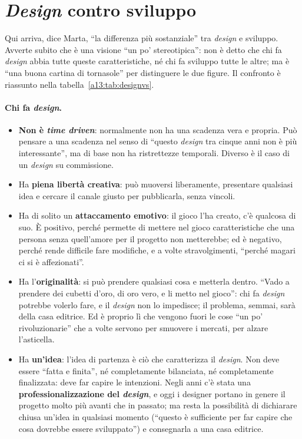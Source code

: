 \section{\emph{Design} contro sviluppo}
\label{a13:sec:designvs}



Qui arriva, dice Marta, ``la differenza più sostanziale'' tra \emph{design} e sviluppo.
Avverte subito che è una visione ``un po' stereotipica'': non è detto che chi fa
\emph{design} abbia tutte queste caratteristiche, né chi fa sviluppo tutte le altre; ma
è ``una buona cartina di tornasole'' per distinguere le due figure. Il confronto è
riassunto nella tabella~\ref{a13:tab:designvs}.

\paragraph{Chi fa \emph{design}.}
\begin{itemize}
  \item \textbf{Non è \emph{time driven}}: normalmente non ha una scadenza vera e propria.
        Può pensare a una scadenza nel senso di ``questo \emph{design} tra cinque anni non
        è più interessante'', ma di base non ha ristrettezze temporali. Diverso è il caso di
        un \emph{design} su commissione.
  \item Ha \textbf{piena libertà creativa}: può muoversi liberamente, presentare qualsiasi
        idea e cercare il canale giusto per pubblicarla, senza vincoli.
  \item Ha di solito un \textbf{attaccamento emotivo}: il gioco l'ha creato, c'è qualcosa
        di suo. È positivo, perché permette di mettere nel gioco caratteristiche che una
        persona senza quell'amore per il progetto non metterebbe; ed è negativo, perché
        rende difficile fare modifiche, e a volte stravolgimenti, ``perché magari ci si è
        affezionati''.
  \item Ha l'\textbf{originalità}: si può prendere qualsiasi cosa e metterla dentro.
        ``Vado a prendere dei cubetti d'oro, di oro vero, e li metto nel gioco'':
        chi fa \emph{design} potrebbe volerlo fare, e il \emph{design} non lo impedisce; il
        problema, semmai, sarà della casa editrice. Ed è proprio lì che vengono fuori le
        cose ``un po' rivoluzionarie'' che a volte servono per smuovere i mercati, per
        alzare l'asticella.
  \item Ha \textbf{un'idea}: l'idea di partenza è ciò che caratterizza il \emph{design}.
        Non deve essere ``fatta e finita'', né completamente bilanciata, né
        completamente finalizzata: deve far capire le intenzioni. Negli anni c'è stata una
        \textbf{professionalizzazione del \emph{design}}, e oggi i designer portano in
        genere il progetto molto più avanti che in passato; ma resta la possibilità di
        dichiarare chiusa un'idea in qualsiasi momento (``questo è sufficiente per far
        capire che cosa dovrebbe essere sviluppato'') e consegnarla a una casa editrice.
\end{itemize}

